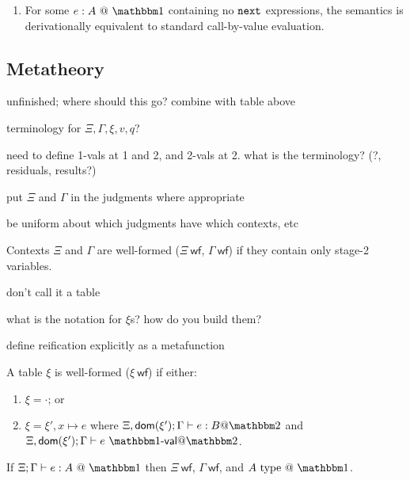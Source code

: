 \begin{enumerate}
\item For some $\colone{e}{A}$ containing no ${\tt next}$ expressions, the semantics is derivationally equivalent to standard call-by-value evaluation.
\end{enumerate}

\subsection{Metatheory}

\TODO unfinished; where should this go? combine with table above

\noindent\TODO terminology for $\Xi,\Gamma,\xi,v,q$?

\noindent\TODO need to define 1-vals at 1 and 2, and 2-vals at 2. what is the
terminology? (?, residuals, results?)

\noindent\TODO put $\Xi$ and $\Gamma$ in the judgments where appropriate

\noindent\TODO be uniform about which judgments have which contexts, etc

\newcommand{\wf}{\ \mathsf{wf}}
\newcommand{\valoo}{\ \bbone\textsf{-}\mathsf{val} @ \bbone}
\newcommand{\valot}{\ \bbone\textsf{-}\mathsf{val} @ \bbtwo}
\newcommand{\valtt}{\ \bbtwo\textsf{-}\mathsf{val} @ \bbtwo}

\begin{definition}
Contexts $\Xi$ and $\Gamma$ are well-formed ($\Xi\wf$, $\Gamma\wf$) if they
contain only stage-2 variables.
\end{definition}

\noindent\TODO don't call it a table

\noindent\TODO what is the notation for $\xi$s? how do you build them?

\noindent\TODO define reification explicitly as a metafunction

\begin{definition}
A table $\xi$ is well-formed ($\xi\wf$) if either:
\begin{enumerate}
\item $\xi = \cdot$; or
\item $\xi = \xi',x\mapsto e$ where
$\Xi,\dom{\xi'};\Gamma\vdash e : B @ \bbtwo$ and
$\Xi,\dom{\xi'};\Gamma\vdash e \valot$.
\end{enumerate}
\end{definition}

\begin{theorem}
If $\Xi;\typesone e A$ then $\Xi\wf$, $\Gamma\wf$, and $A\istypeone$.
\end{theorem}


